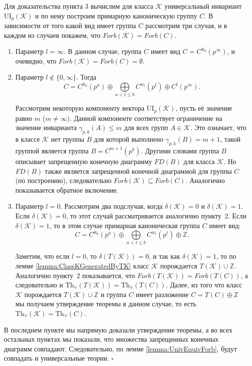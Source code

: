 \documentclass[a4paper,11pt,twoside]{article}
\def\K{{\mathcal{K}}}
\def\Z{{\mathbb{Z}}}
\def\Tha{{\mathrm{Th}_\forall}}
\def\ui{{\mathrm{UI}}}
\begin{document}
Для доказательства пункта 3 вычислим для класса $\K$ универсальный инвариант $\ui_p(\K)$ и по нему построим примарную каноническую группу $C$. В зависимости от того какой вид имеет группа $C$ рассмотрим три случая, и в каждом из случаев покажем, что $Forb(\K) = Forb(C)$.
\begin{enumerate}
\item Параметр $l = \infty$. В данном случае, группа $C$ имеет вид $C = C^{\aleph_0} (p^\infty)$, и очевидно, что $Forb(\K) = Forb(C) = \emptyset$.
\item Параметр $l \notin \{0, \infty\}$. Тогда 
$$ C = C^{\aleph_0}(p^a) \oplus \bigoplus\limits_{ a < t \leq b} C^{w_t}(p^t) \oplus C^l(p^\infty).$$

Рассмотрим некоторую компоненту вектора $\ui_p(\K)$, пусть её значение равно $m$ ($m \neq \infty$). Данной компоненте соответствует ограничение на значение инварианта $\gamma_{p,k}(A) \leq m$ для всех групп $A \in \K$. Это означает, что в классе $\K$ нет группы $B$ для которой выполнено $\gamma_{p,k}(B) = m+1$, такой группой является группа $B = C^{m+1}(p^k)$. Другими словами группа $B$ описывает запрещенную конечную диаграмму $FD(B)$ для класса $\K$. Но $FD(B)$ также является запрещенной конечной диаграммой для группы $C$ (по построению), следовательно $Forb(\K) \subseteq Forb(C).$ Аналогично показывается обратное включение.

\item Параметр $l = 0$. Рассмотрим два подслучая, когда $\delta(\K) = 0$ и ${\delta(\K) = 1}$. Если $\delta(\K) = 0$, то этот случай рассматривается аналогично пункту~2. Если $\delta(\K) = 1$, то в этом случае примарная каноническая группа $C$ имеет вид:
$$ C = C^{\aleph_0}(p^a) \oplus \bigoplus\limits_{ a < t \leq b} C^{w_t}(p^t) \oplus \Z.$$

Заметим, что если $l = 0$, то $\delta(T(\K)) = 0$, и так как $\delta(\K) = 1$, то по лемме \ref{lemma:ClassKGeneratedByTK} класс $\K$ порождается $T(\K) \cup \Z$. Аналогично пункту~2 показывается, что $Forb(T(\K)) = Forb(T(C))$, а следовательно и $\Tha(T(\K)) = \Tha(T(C))$. Далее, из того что класс $\K$ порождается $T(\K) \cup \Z$ и группа $C$ имеет разложение $C = T(C) \oplus \Z$ мы получаем утверждение теоремы в данном случае, то есть $\Tha(\K) = \Tha(C)$.
\end{enumerate}

В последнем пункте мы напрямую доказали утверждение теоремы, а во всех остальных пунктах мы показали, что множества запрещенных конечных диаграмм совпадают. Следовательно, по лемме \ref{lemma:UnivEquivForb}, будут совпадать и универсальные теории. $\square$
\end{document}
